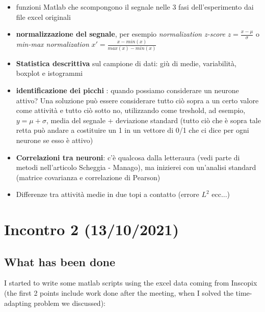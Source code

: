 \documentclass[a4paper]{article}
\begin{document}
\begin{itemize}
	\item funzioni Matlab che scompongono il segnale nelle 3 fasi dell'esperimento dai file excel originali
	
	\item \textbf{ normalizzazione del segnale}, per esempio \textit{normalization z-score} $z = \frac{x - \mu}{\sigma}$ o \textit{min-max normalization} $x' = \frac{x - min(x)}{max(x) - min(x)}$
	
	\item \textbf{Statistica descrittiva} sul campione di dati: giù di medie, variabilità, boxplot e istogrammi
	
	\item \textbf{identificazione dei picchi} : quando possiamo considerare un neurone attivo? Una soluzione può essere considerare tutto ciò sopra a un certo valore come attività e tutto ciò sotto no, utilizzando come treshold, ad esempio, $ y = \mu + \sigma $, media del segnale + deviazione standard (tutto ciò che è sopra tale retta può andare a costituire un 1 in un vettore di 0/1 che ci dice per ogni neurone se esso è attivo)
	
	\item \textbf{Correlazioni tra neuroni}: c'è qualcosa dalla letteraura (vedi parte di metodi nell'articolo Scheggia - Manago), ma inizierei con un'analisi standard (matrice covarianza e correlazione di Pearson)
	
	\item Differenze tra attività medie in due topi a contatto (errore $L^2$ ecc...)
\end{itemize}
	
	
	
	\section{Incontro 2 (13/10/2021)}
	
	\subsection{What has been done}
	
	I started to write some matlab scripts using the excel data coming from Inscopix (the first 2 points include work done after the meeting, when I solved the time-adapting problem we discussed):
	
\end{document}
